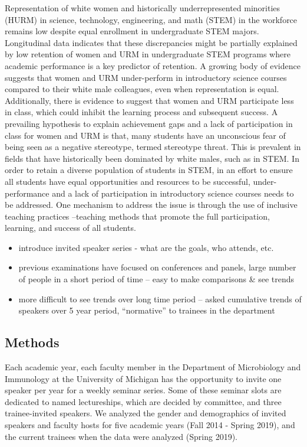 \documentclass[10pt,]{article}
\begin{document}
Representation of white women and historically underrepresented
minorities (HURM) in science, technology, engineering, and math (STEM)
in the workforce remains low despite equal enrollment in undergraduate
STEM majors. Longitudinal data indicates that these discrepancies might
be partially explained by low retention of women and URM in
undergraduate STEM programs where academic performance is a key
predictor of retention. A growing body of evidence suggests that women
and URM under-perform in introductory science courses compared to their
white male colleagues, even when representation is equal. Additionally,
there is evidence to suggest that women and URM participate less in
class, which could inhibit the learning process and subsequent success.
A prevailing hypothesis to explain achievement gaps and a lack of
participation in class for women and URM is that, many students have an
unconscious fear of being seen as a negative stereotype, termed
stereotype threat. This is prevalent in fields that have historically
been dominated by white males, such as in STEM. In order to retain a
diverse population of students in STEM, in an effort to ensure all
students have equal opportunities and resources to be successful,
under-performance and a lack of participation in introductory science
courses needs to be addressed. One mechanism to address the issue is
through the use of inclusive teaching practices --teaching methods that
promote the full participation, learning, and success of all students.

\begin{itemize}
\item
  introduce invited speaker series - what are the goals, who attends,
  etc.
\item
  previous examinations have focused on conferences and panels, large
  number of people in a short period of time -- easy to make comparisons
  \& see trends
\item
  more difficult to see trends over long time period -- asked cumulative
  trends of speakers over 5 year period, ``normative'' to trainees in
  the department
\end{itemize}

\subsection{Methods}\label{methods}

Each academic year, each faculty member in the Department of
Microbiology and Immunology at the University of Michigan has the
opportunity to invite one speaker per year for a weekly seminar series.
Some of these seminar slots are dedicated to named lectureships, which
are decided by committee, and three trainee-invited speakers. We
analyzed the gender and demographics of invited speakers and faculty
hosts for five academic years (Fall 2014 - Spring 2019), and the current
trainees when the data were analyzed (Spring 2019).
\end{document}

